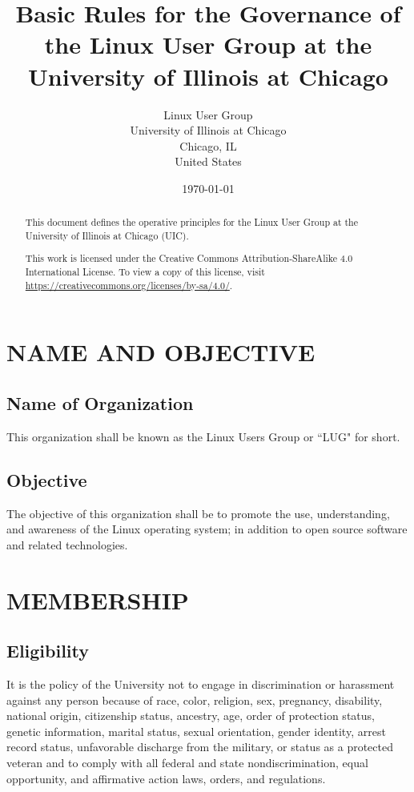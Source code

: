 \documentclass[letter]{report}
\begin{document}

\title{Basic Rules for the Governance of the Linux User Group at the University
of Illinois at Chicago}
\author{Linux User Group\\
	University of Illinois at Chicago\\
	Chicago, IL\\
	United States}
\date{\today}
\maketitle


\begin{abstract}
	This document defines the operative principles for the Linux
	User Group at the University of Illinois at Chicago (UIC).

	\vfill
	This work is licensed under the Creative Commons Attribution-ShareAlike
	4.0 International License. To view a copy of this license, visit
	\url{https://creativecommons.org/licenses/by-sa/4.0/}.
\end{abstract}


\tableofcontents


\chapter{NAME AND OBJECTIVE}
\section{Name of Organization}
This organization shall be known as the Linux Users Group or ``LUG" for short.

\section{Objective}
The objective of this organization shall be to promote the use, understanding,
and awareness of the Linux operating system; in addition to open source software
and related technologies.


\chapter{MEMBERSHIP}
\section{Eligibility}
It is the policy of the University not to engage in discrimination or harassment
against any person because of race, color, religion, sex, pregnancy, disability,
national origin, citizenship status, ancestry, age, order of protection status,
genetic information, marital status, sexual orientation, gender identity, arrest
record status,  unfavorable discharge from the military, or status as a
protected veteran and to comply with all federal and state nondiscrimination,
equal opportunity, and affirmative action laws, orders, and regulations.
\end{document}
